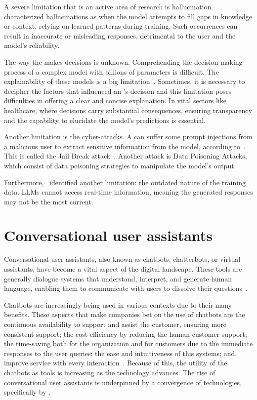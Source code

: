 A severe limitation that is an active area of research is hallucination.~\citet{church_emerging_2023} characterized {\llm} hallucinations as when the model attempts to fill gaps in knowledge or context, relying on learned patterns during training. Such occurrences can result in inaccurate or misleading responses, detrimental to the user and the model's reliability.

The way the {\llm} makes decisions is unknown. Comprehending the decision-making process of a complex model with billions of parameters is difficult. The explainability of these models is a big limitation~\cite{hadi_LLM_2023}. Sometimes, it is necessary to decipher the factors that influenced an {\llm}'s decision and this limitation poses difficulties in offering a clear and concise explanation. In vital sectors like healthcare, where decisions carry substantial consequences, ensuring transparency and the capability to elucidate the model's predictions is essential.

Another limitation is the cyber-attacks. A {\llm} can suffer some prompt injections from a malicious user to extract sensitive information from the model, according to~\citet{kshetri_cybercrime_2023}. This is called the Jail Break attack~\cite{hadi_LLM_2023}. Another attack is Data Poisoning Attacks, which consist of data poisoning strategies to manipulate the model's output.

Furthermore,~\citet{liu_prompting_nodate}  identified another limitation: the outdated nature of the training data. LLMs cannot access real-time information, meaning the generated responses may not be the most current.



\section{Conversational user assistants}

Conversational user assistants, also known as chatbots, chatterbots, or virtual assistants, have become a vital aspect of the digital landscape. These tools are generally dialogue systems that understand, interpret, and generate human language, enabling them to communicate with users to dissolve their questions~\cite{borah_survey_2019}.

Chatbots are increasingly being used in various contexts due to their many benefits. These aspects that make companies bet on the use of chatbots are the continuous availability to support and assist the customer, ensuring more consistent support; the cost-efficiency by reducing the human customer support; the time-saving both for the organization and for customers due to the immediate responses to the user queries; the ease and intuitiveness of this systems; and, improve service with every interaction~\cite{misischia_chatbots_2022}. Because of this, the utility of the chatbots as tools is increasing as the technology advances. The rise of conversational user assistants is underpinned by a convergence of technologies, specifically by {\llm}.



